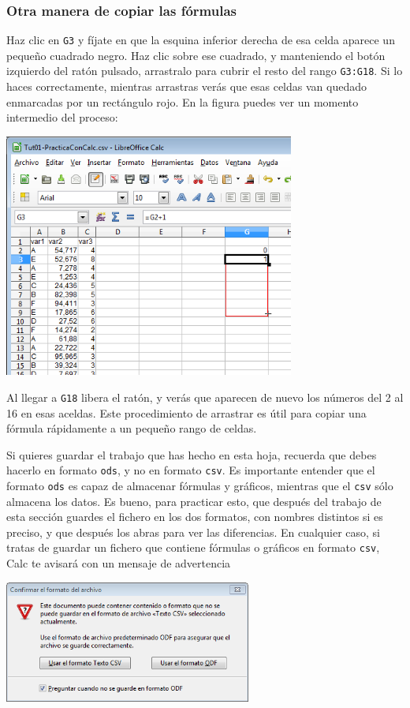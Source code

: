 \documentclass[10pt,a4paper]{article}\usepackage[]{graphicx}\usepackage[]{color}
\newcounter {cont01}
\begin{document}
\subsubsection*{Otra manera de copiar las fórmulas}
Haz clic en {\tt G3} y fíjate en que la esquina inferior derecha de esa celda aparece un pequeño cuadrado negro. Haz clic sobre ese cuadrado, y manteniendo el botón izquierdo del ratón pulsado, arrastralo para cubrir el resto del rango {\tt G3:G18}. Si lo haces correctamente, mientras arrastras verás que esas celdas van quedado enmarcadas por un rectángulo rojo. En la figura puedes ver un momento intermedio del proceso:
    \begin{center}
    \includegraphics[height=8cm]{../fig/Tut01-Calc-Formula-07.png}
    \end{center}
Al llegar a {\tt G18} libera el ratón, y verás que aparecen de nuevo los números del 2 al 16 en esas aceldas. Este procedimiento de arrastrar es útil para copiar una fórmula rápidamente a un pequeño rango de celdas.

Si quieres guardar el trabajo que has hecho en esta hoja, recuerda que debes hacerlo en formato {\tt ods}, y no en formato {\tt csv}. Es importante entender que el formato {\tt ods} es capaz de almacenar fórmulas y gráficos, mientras que el {\tt csv} sólo almacena los datos. Es bueno, para practicar esto, que después del trabajo de esta sección guardes el fichero en los dos formatos, con nombres distintos si es preciso, y que después los abras para ver las diferencias. En cualquier caso, si tratas de guardar un fichero que contiene fórmulas o gráficos en formato {\tt csv}, Calc te avisará con un mensaje de advertencia
    \begin{center}
    \includegraphics[height=4cm]{../fig/Tut01-Calc-Formula-08.png}
    \end{center}
\end{document}
